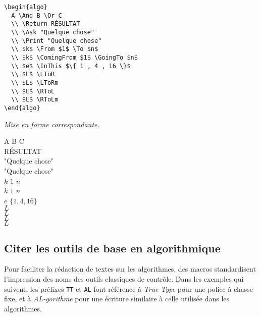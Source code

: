 \documentclass[12pt,a4paper]{article}
\theoremstyle{definition}
\newenvironment{frame-gene}[1][]{
	\begin{tcolorbox}[
		title        = #1, 
		colbacktitle = black!10!white, 
		colback      = white, 
		coltitle     = black,
		fonttitle    = \bfseries\itshape\small, 
		breakable,
		center title]
}{
	\end{tcolorbox}
}
\newcommand\myquote[1]{{\itshape \og #1 \fg}}
\begin{document}
\begin{multicols}{2}
    \centering
    \begin{frame-gene}
\begin{verbatim}
\begin{algo}
  A \And B \Or C
  \\ \Return RÉSULTAT
  \\ \Ask "Quelque chose"
  \\ \Print "Quelque chose"
  \\ $k$ \From $1$ \To $n$
  \\ $k$ \ComingFrom $1$ \GoingTo $n$
  \\ $e$ \InThis $\{ 1 , 4 , 16 \}$
  \\ $L$ \LToR
  \\ $L$ \LToRm
  \\ $L$ \RToL
  \\ $L$ \RToLm
\end{algo}
\end{verbatim}
    \end{frame-gene}
    \vfill\null
    \columnbreak
    \textit{Mise en forme correspondante.}
\begin{algo}
  A \And B \Or C
  \\ \Return RÉSULTAT
  \\ \Ask "Quelque chose"
  \\ \Print "Quelque chose"
  \\ $k$ \From $1$ \To $n$
  \\ $k$ \ComingFrom $1$ \GoingTo $n$
  \\ $e$ \InThis $\{ 1 , 4 , 16 \}$
  \\ $L$ \LToR
  \\ $L$ \LToRm
  \\ $L$ \RToL
  \\ $L$ \RToLm
\end{algo}
    \vfill\null
\end{multicols}






\subsection{Citer les outils de base en algorithmique}

Pour faciliter la rédaction de textes sur les algorithmes, des macros standardisent l'impression des noms des outils classiques de contrôle.
Dans les exemples qui suivent, les préfixes \verb+TT+ et \verb+AL+ font référence à \myquote{True Type} pour une police à chasse fixe, et à \myquote{AL-gorithme} pour une écriture similaire à celle utilisée dans les algorithmes.
\end{document}
